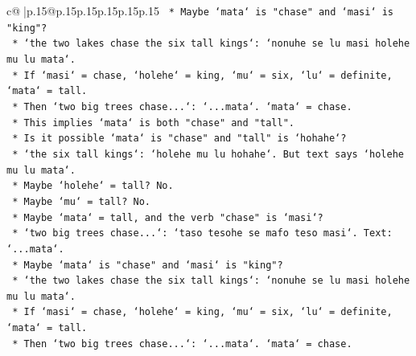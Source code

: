 \documentclass{article}
\begin{document}
{\begin{supertabular}{c@{$\;$}|p{.15\linewidth}@{}p{.15\linewidth}p{.15\linewidth}p{.15\linewidth}p{.15\linewidth}p{.15\linewidth}}
{{{\texttt{                                                    *   Maybe `mata` is "chase" and `masi` is "king"?} \\
\texttt{                                                        *   `the two lakes chase the six tall kings`: `nonuhe se lu masi holehe mu lu mata`.} \\
\texttt{                                                        *   If `masi` = chase, `holehe` = king, `mu` = six, `lu` = definite, `mata` = tall.} \\
\texttt{                                                        *   Then `two big trees chase...`: `...mata`. `mata` = chase.} \\
\texttt{                                                        *   This implies `mata` is both "chase" and "tall".} \\
\texttt{                                                        *   Is it possible `mata` is "chase" and "tall" is `hohahe`?} \\
\texttt{                                                            *   `the six tall kings`: `holehe mu lu hohahe`. But text says `holehe mu lu mata`.} \\
\texttt{                                                            *   Maybe `holehe` = tall? No.} \\
\texttt{                                                            *   Maybe `mu` = tall? No.} \\
\texttt{                                                            *   Maybe `mata` = tall, and the verb "chase" is `masi`?} \\
\texttt{                                                                *   `two big trees chase...`: `taso tesohe se mafo teso masi`. Text: `...mata`.} \\
\texttt{                                                                *   Maybe `mata` is "chase" and `masi` is "king"?} \\
\texttt{                                                                    *   `the two lakes chase the six tall kings`: `nonuhe se lu masi holehe mu lu mata`.} \\
\texttt{                                                                    *   If `masi` = chase, `holehe` = king, `mu` = six, `lu` = definite, `mata` = tall.} \\
\texttt{                                                                    *   Then `two big trees chase...`: `...mata`. `mata` = chase.} \\
}}}
\end{supertabular}}
\end{document}
